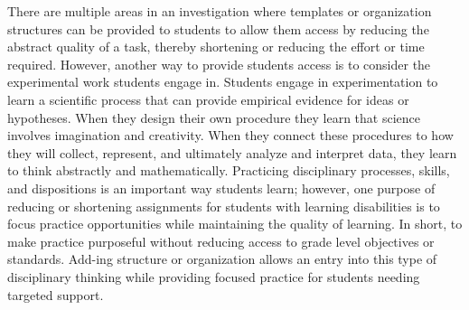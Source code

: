 \documentclass[11pt]{sig-alternate}
\begin{document}
\begin{large}
There are multiple areas in an investigation where templates or organization structures can be provided to students to allow them access by reducing the abstract quality of a task, thereby shortening or reducing the effort or time required. However, another way to provide students access is to consider the experimental work students engage in. Students engage in experimentation to learn a scientific process that can provide empirical evidence for ideas or hypotheses. When they design their own procedure they learn that science involves imagination and creativity. When they connect these procedures to how they will collect, represent, and ultimately analyze and interpret data, they learn to think abstractly and mathematically. Practicing disciplinary processes, skills, and dispositions is an important way students learn; however, one purpose of reducing or shortening assignments for students with learning disabilities is to focus practice opportunities while maintaining the quality of learning. In short, to make practice purposeful without reducing access to grade level objectives or standards. Add-ing structure or organization allows an entry into this type of disciplinary thinking while providing focused practice for students needing targeted support. 


\end{large}
\end{document}
